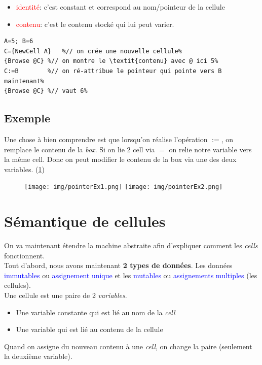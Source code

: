 \documentclass{report}
\begin{document}
\begin{itemize}
\item \textcolor{red}{identité}: c'est constant et correspond au nom/pointeur de la cellule 
\item \textcolor{red}{contenu}: c'est le contenu stocké qui lui peut varier.
\end{itemize}

\begin{lstlisting}[escapechar=\%]
A=5; B=6
C={NewCell A}	%// on crée une nouvelle cellule%
{Browse @C}	%// on montre le \textit{contenu} avec @ ici 5%
C:=B		%// on ré-attribue le pointeur qui pointe vers B maintenant%
{Browse @C}	%// vaut 6%
\end{lstlisting}

\subsection{Exemple}
Une chose à bien comprendre est que lorsqu'on réalise l'opération $:=$, on remplace le contenu de la \textit{box}. Si on lie 2 cell via $=$ on relie notre variable vers la même cell. Donc on peut modifier le contenu de la box via une des deux variables. (\ref{pointerEx1})
\begin{figure}[H]
\centering
\texttt{[image: img/pointerEx1.png]} \label{pointerEx1}
\texttt{[image: img/pointerEx2.png]}
\end{figure}

\section{Sémantique de cellules}
On va maintenant étendre la machine abstraite afin d'expliquer comment les \textit{cells} fonctionnent.\\
Tout d'abord, nous avons maintenant \textbf{2 types de données}. Les données \textcolor{blue}{immutables} ou \textcolor{blue}{assignement unique} et les \textcolor{blue}{mutables} ou \textcolor{blue}{assignements multiples} (les cellules).\\
Une cellule est une paire de 2 \textit{variables}.
\begin{itemize}
\item Une variable constante qui est lié au nom de la \textit{cell}
\item Une variable qui est lié au contenu de la cellule
\end{itemize}
Quand on assigne du nouveau contenu à une \textit{cell}, on change la paire (seulement la deuxième variable).\\
\end{document}

